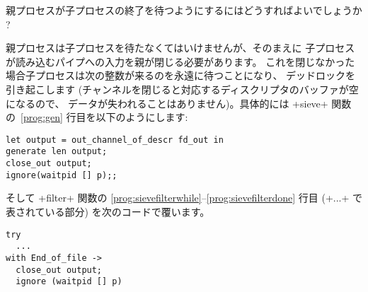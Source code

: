 \begin{exercise}
親プロセスが子プロセスの終了を待つようにするにはどうすればよいでしょうか ?
\end{exercise}
\begin{answer}
親プロセスは子プロセスを待たなくてはいけませんが、そのまえに
子プロセスが読み込むパイプへの入力を親が閉じる必要があります。
これを閉じなかった場合子プロセスは次の整数が来るのを永遠に待つことになり、
デッドロックを引き起こします (チャンネルを閉じると対応するディスクリプタのバッファが空になるので、
データが失われることはありません)。具体的には \ml+sieve+ 関数の~\ref{prog:gen} 行目を以下のようにします:
\begin{lstlisting}
let output = out_channel_of_descr fd_out in
generate len output;
close_out output;
ignore(waitpid [] p);;
\end{lstlisting}
そして \ml+filter+ 関数の \ref{prog:sievefilterwhile}--\ref{prog:sievefilterdone} 行目 (\ml+...+ で表されている部分) を次のコードで覆います。
\begin{lstlisting}
try
  ...
with End_of_file ->
  close_out output;
  ignore (waitpid [] p)
\end{lstlisting}
\end{answer}

